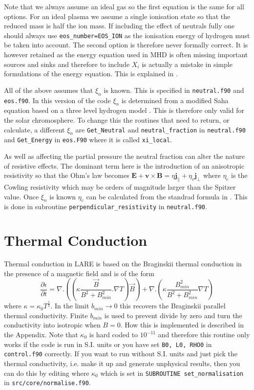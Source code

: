 \documentclass[11pt]{article}
\begin{document}
Note that we always assume an ideal gas so the first equation is the same for all options. For an ideal plasma we assume a single ionisation state so that the reduced mass is half the ion mass. If including the effect of neutrals fully one should always use \texttt{eos\_number=EOS\_ION} as the ionisation energy of hydrogen must be taken into account. The second option is therefore never formally correct. It is however retained as the energy equation used in MHD is often missing important sources and sinks and therefore to include $X_i$ is actually a mistake in simple formulations of the energy equation. This is explained in \cite{flux-emergence}.

All of the above assumes that $\xi_n$ is known. This is specified in \texttt{neutral.f90} and \texttt{eos.f90}. In this version of the code $\xi_n$ is determined from a modified Saha equation based on a three level hydrogen model \cite{brown}. This is therefore only valid for the solar chromosphere. To change this the routines that need to return, or calculate, a different $\xi_n$ are \texttt{Get\_Neutral} and \texttt{neutral\_fraction} in \texttt{neutral.f90} and \texttt{Get\_Energy} in \texttt{eos.F90} where it is called \texttt{xi\_local}.

As well as affecting the partial pressure the neutral fraction can alter the nature of resistive effects. The dominant term here is the introduction of an anisotropic resistivity so that the Ohm's law becomes 
$\mathbf{E}+\mathbf{v}\times\mathbf{B}=\eta \mathbf{j_{\parallel}} + \eta_c \mathbf{j_{\perp}}$ 
where $\eta_c$ is the Cowling resistivity which may be orders of magnitude larger than the Spitzer value. Once $\xi_n$ is known $\eta_c$ can be calculated from the standrad formula in \cite{flux-emergence}. This is done in subroutine \texttt{perpendicular\_resistivity} in \texttt{neutral.f90}. 

\section{Thermal Conduction} %
\label{sec:thermal_conduction}
Thermal conduction in LARE is based on the Braginskii thermal conduction in the presence of a magnetic field and is of the form\\
\[
\frac{\partial \epsilon}{\partial t} = \nabla . \left(\left(\kappa \frac{\vec{B}}{B^2+B_{min}^2}. \nabla T\right) \vec{B} \right) +  \nabla . \left(\kappa  \frac{B_{min}^2}{B^2+B_{min}^2}  \nabla T \right)
\]
where $\kappa = \kappa_0  T^\frac{5}{2}$. In the limit $b_{min}\to 0$ this recovers the Braginskii parallel thermal conductivity. Finite $b_{min}$ is used to prevent divide by zero and turn the conductivity into isotropic when $B=0$.  How this is implemented is described in the Appendix. Note that $\kappa_0$ is hard coded to $10^{-11}$ and therefore this routine only works if the code is run in S.I. units or you have set {\tt B0, L0, RHO0} in {\tt control.f90} correctly. If you want to run without S.I. units and just pick the thermal conductivity, i.e. make it up and generate unphysical results, then you can do this by editing where $\kappa_0$ which is set in {\tt SUBROUTINE set\_normalisation} in {\tt src/core/normalise.f90}.    
\end{document}
